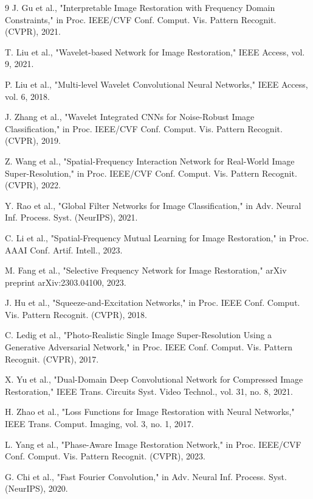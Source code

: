 \documentclass[12pt]{article}
\begin{document}
\begin{thebibliography}{9}
J. Gu et al., "Interpretable Image Restoration with Frequency Domain Constraints," in Proc. IEEE/CVF Conf. Comput. Vis. Pattern Recognit. (CVPR), 2021.

T. Liu et al., "Wavelet-based Network for Image Restoration," IEEE Access, vol. 9, 2021.

P. Liu et al., "Multi-level Wavelet Convolutional Neural Networks," IEEE Access, vol. 6, 2018.

J. Zhang et al., "Wavelet Integrated CNNs for Noise-Robust Image Classification," in Proc. IEEE/CVF Conf. Comput. Vis. Pattern Recognit. (CVPR), 2019.

Z. Wang et al., "Spatial-Frequency Interaction Network for Real-World Image Super-Resolution," in Proc. IEEE/CVF Conf. Comput. Vis. Pattern Recognit. (CVPR), 2022.

Y. Rao et al., "Global Filter Networks for Image Classification," in Adv. Neural Inf. Process. Syst. (NeurIPS), 2021.

C. Li et al., "Spatial-Frequency Mutual Learning for Image Restoration," in Proc. AAAI Conf. Artif. Intell., 2023.

M. Fang et al., "Selective Frequency Network for Image Restoration," arXiv preprint arXiv:2303.04100, 2023.

J. Hu et al., "Squeeze-and-Excitation Networks," in Proc. IEEE Conf. Comput. Vis. Pattern Recognit. (CVPR), 2018.

C. Ledig et al., "Photo-Realistic Single Image Super-Resolution Using a Generative Adversarial Network," in Proc. IEEE Conf. Comput. Vis. Pattern Recognit. (CVPR), 2017.

X. Yu et al., "Dual-Domain Deep Convolutional Network for Compressed Image Restoration," IEEE Trans. Circuits Syst. Video Technol., vol. 31, no. 8, 2021.

H. Zhao et al., "Loss Functions for Image Restoration with Neural Networks," IEEE Trans. Comput. Imaging, vol. 3, no. 1, 2017.

L. Yang et al., "Phase-Aware Image Restoration Network," in Proc. IEEE/CVF Conf. Comput. Vis. Pattern Recognit. (CVPR), 2023.

G. Chi et al., "Fast Fourier Convolution," in Adv. Neural Inf. Process. Syst. (NeurIPS), 2020.


\end{thebibliography}
\end{document}
